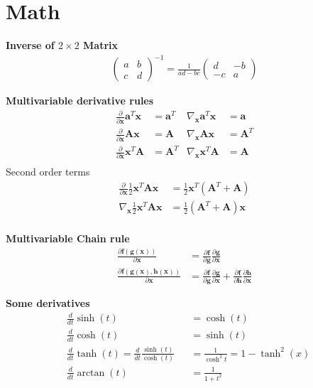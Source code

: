 \section{Math}
\textbf{Inverse of \(2\times2\) Matrix}
\begin{align*}
    \begin{pmatrix}
        a & b \\ c & d 
        \end{pmatrix}^{-1} = 
    \frac{1}{ad-bc}
    \begin{pmatrix}
        d & -b \\ -c & a 
    \end{pmatrix}
\end{align*}

\textbf{Multivariable derivative rules}
\begin{align*}
    \frac{\partial}{\partial\bm{x}} \bm{a}^T\bm{x} &=  \bm{a}^T &
    \nabla_{\bm{x}}\bm{a}^T\bm{x} &=  \bm{a} \\
    \frac{\partial}{\partial\bm{x}} \bm{Ax} &=  \bm{A} &
    \nabla_{\bm{x}}\bm{Ax} &= \bm{A}^T  \\
    \frac{\partial}{\partial\bm{x}} \bm{x}^T\bm{A} &=  \bm{A}^T &
    \nabla_{\bm{x}}\bm{x}^T\bm{A} &= \bm{A} \\
\end{align*}
Second order terms
\begin{align*}
    \frac{\partial}{\partial\bm{x}} \frac{1}{2}\bm{x}^T\bm{Ax} &=  \frac{1}{2}\bm{x}^T(\bm{A}^T+\bm{A}) \\
    \nabla_{\bm{x}} \frac{1}{2}\bm{x}^T\bm{Ax} &=  \frac{1}{2}(\bm{A}^T+\bm{A})\bm{x} \\
\end{align*}

\textbf{Multivariable Chain rule}
\begin{align*}
    \frac{\partial\bm{f}(\bm{g}(\bm{x}))}{\partial\bm{x}} &= \frac{\partial\bm{f}}{\partial\bm{g}}
    \frac{\partial\bm{g}}{\partial\bm{x}} \\
    \frac{\partial\bm{f}(\bm{g}(\bm{x}),\bm{h}(\bm{x}))}{\partial\bm{x}} &= \frac{\partial\bm{f}}{\partial\bm{g}}
     \frac{\partial\bm{g}}{\partial\bm{x}} + \frac{\partial\bm{f}}{\partial\bm{h}}\frac{\partial\bm{h}}{\partial\bm{x}}
\end{align*}

\textbf{Some derivatives}
\begin{align*}
    &\frac{d}{dt}\sinh(t) &&= \cosh(t) \\
    &\frac{d}{dt}\cosh(t) &&= \sinh(t) \\
    &\frac{d}{dt}\tanh(t) = \frac{d}{dt}\frac{\sinh(t)}{\cosh(t)} &&= \frac{1}{\cosh^2t} = 1-\tanh^2(x) \\
    &\frac{d}{dt}\arctan(t) &&= \frac{1}{1+t^2} \\
\end{align*}


